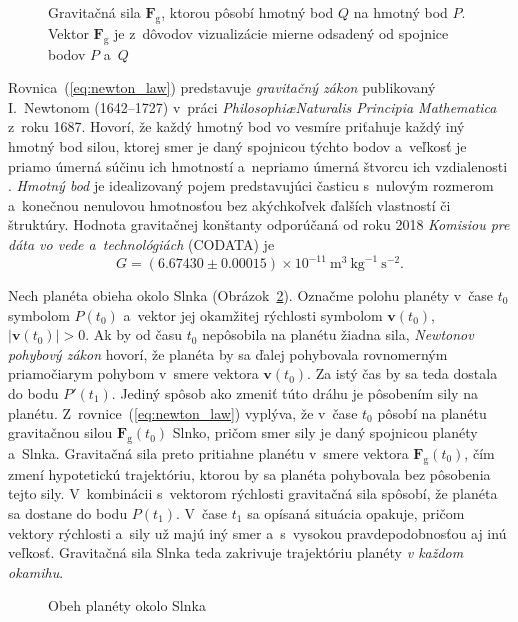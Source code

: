 \documentclass[a4paper, 12pt]{book}
\newcommand{\gidx}{\mathrm g}
\let\vec\mathbf
\begin{document}
\begin{figure}[b]
\centering

\caption{Gravitačná sila $\vec F_\gidx$, ktorou pôsobí hmotný bod $Q$ na hmotný 
bod $P$.  Vektor $\vec F_\gidx$ je z~dôvodov vizualizácie mierne odsadený od 
spojnice bodov $P$ a~$Q$}
\label{fig:newton_law}
\end{figure}

Rovnica~(\ref{eq:newton_law}) predstavuje \emph{gravitačný zákon} publikovaný 
I.~Newtonom (1642--1727) v~práci \emph{Philosophi\ae Naturalis Principia 
Mathematica} z~roku 1687.  Hovorí, že každý hmotný bod vo vesmíre priťahuje 
každý iný hmotný bod silou, ktorej smer je daný spojnicou týchto bodov 
a~veľkosť je priamo úmerná súčinu ich hmotností a~nepriamo úmerná štvorcu ich 
vzdialenosti \citep{Kellogg1967}.  \emph{Hmotný bod} je idealizovaný pojem 
predstavujúci časticu s~nulovým rozmerom a~konečnou nenulovou hmotnosťou bez 
akýchkoľvek ďalších vlastností či štruktúry.  Hodnota gravitačnej konštanty 
odporúčaná od roku 2018 \emph{Komisiou pre dáta vo vede a~technológiách} 
(CODATA) je
%
\begin{equation}
G = (6.67430 \pm 0.00015) \times 10^{-11} \ \mathrm{m}^3 \ \mathrm{kg}^{-1} 
\ \mathrm{s}^{-2}{.}
\end{equation}

Nech planéta obieha okolo Slnka (Obrázok~\ref{fig:orbital_motion}).  Označme 
polohu planéty v~čase $t_0$ symbolom $P(t_0)$ a~vektor jej okamžitej rýchlosti 
symbolom $\vec v(t_0)$, $| \vec v(t_0) | > 0$.  Ak by od času $t_0$ nepôsobila 
na planétu žiadna sila, \emph{Newtonov pohybový zákon} hovorí, že planéta by sa 
ďalej pohybovala rovnomerným priamočiarym pohybom v~smere vektora $\vec 
v(t_0)$.  Za istý čas by sa teda dostala do bodu $P'(t_1)$.  Jediný spôsob ako 
zmeniť túto dráhu je pôsobením sily na planétu.  
Z~rovnice~(\ref{eq:newton_law}) vyplýva, že v~čase $t_0$ pôsobí na planétu 
gravitačnou silou $\vec F_\gidx(t_0)$ Slnko, pričom smer sily je daný spojnicou 
planéty a~Slnka.  Gravitačná sila preto pritiahne planétu v~smere vektora $\vec 
F_\gidx(t_0)$, čím zmení hypotetickú trajektóriu, ktorou by sa planéta 
pohybovala bez pôsobenia tejto sily.  V~kombinácii s~vektorom rýchlosti 
gravitačná sila spôsobí, že planéta sa dostane do bodu $P(t_1)$.  V~čase $t_1$ 
sa opísaná situácia opakuje, pričom vektory rýchlosti a~sily už majú iný smer 
a~s~vysokou pravdepodobnosťou aj inú veľkosť.  Gravitačná sila Slnka teda 
zakrivuje trajektóriu planéty \emph{v každom okamihu}.

\begin{figure}
\centering

\caption{Obeh planéty okolo Slnka}
\label{fig:orbital_motion}
\end{figure}
\end{document}
